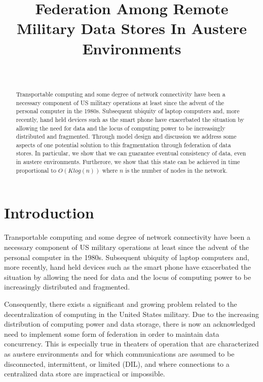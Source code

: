 \documentclass[10pt]{./IEEEtran}
\begin{document}
\title{Federation Among Remote Military Data Stores In Austere Environments}

\author{\\
}


\maketitle


\begin{abstract}
Transportable computing and some degree of network connectivity have been a necessary component of US military operations at least since the advent of the personal computer in the 1980s.  Subsequent ubiquity of laptop computers and, more recently, hand held devices such as the smart phone have exacerbated the situation by allowing the need for data and the locus of computing power to be increasingly distributed and fragmented.  Through model design and discussion we address some aspects of one potential solution to this fragmentation through federation of data stores.  In particular, we show that we can guarantee eventual consistency of data, even in austere environments.  Furtherore, we show that this state can be achieved in time proportional to $O(K log(n))$ where $n$ is the number of nodes in the network.

\end{abstract}


\IEEEpeerreviewmaketitle


\section{Introduction}
\label{sec:introduction}
Transportable computing and some degree of network connectivity have been a necessary component of US military operations at least since the advent of the personal computer in the 1980s.  Subsequent ubiquity of laptop computers and, more recently, hand held devices such as the smart phone have exacerbated the situation by allowing the need for data and the locus of computing power to be increasingly distributed and fragmented.  

Consequently, there exists a significant and growing problem related to the decentralization of computing in the United States military.  Due to the increasing distribution of computing power and data storage, there is now an acknowledged need to implement some form of federation\cite{Takai:2012} in order to maintain data concurrency.  This is especially true in theaters of operation that are characterized as austere environments and for which communications are assumed to be disconnected, intermittent, or limited (DIL), and where connections to a centralized data store are impractical or impossible\cite{Sonnenberg:2009}.
\end{document}
